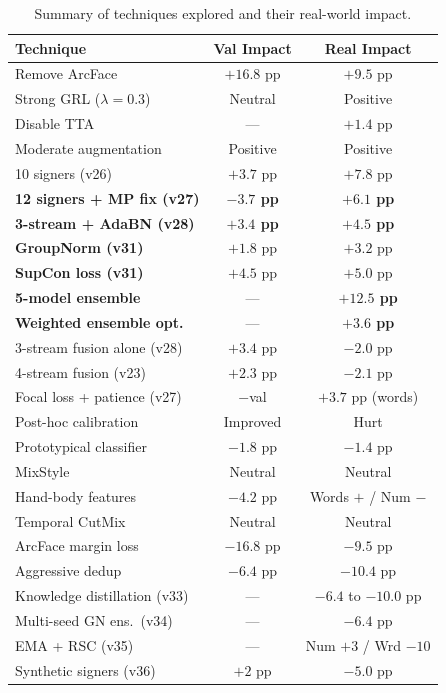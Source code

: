 \documentclass[conference]{IEEEtran}
\begin{document}
\begin{table}[t]
\centering
\caption{Summary of techniques explored and their real-world impact.}
\label{tab:whatworked}
\small
\begin{tabular}{@{}lcc@{}}
\toprule
\textbf{Technique} & \textbf{Val Impact} & \textbf{Real Impact} \\
\midrule
Remove ArcFace & $+16.8$ pp & $+9.5$ pp \\
Strong GRL ($\lambda=0.3$) & Neutral & Positive \\
Disable TTA & --- & $+1.4$ pp \\
Moderate augmentation & Positive & Positive \\
10 signers (v26) & $+3.7$ pp & $+7.8$ pp \\
\textbf{12 signers + MP fix (v27)} & \textbf{$-3.7$ pp} & \textbf{$+6.1$ pp} \\
\textbf{3-stream + AdaBN (v28)} & \textbf{$+3.4$ pp} & \textbf{$+4.5$ pp} \\
\textbf{GroupNorm (v31)} & $+1.8$ pp & $+3.2$ pp \\
\textbf{SupCon loss (v31)} & $+4.5$ pp & $+5.0$ pp \\
\textbf{5-model ensemble} & --- & \textbf{$+12.5$ pp} \\
\textbf{Weighted ensemble opt.} & --- & \textbf{$+3.6$ pp} \\
\midrule
3-stream fusion alone (v28) & $+3.4$ pp & $-2.0$ pp \\
4-stream fusion (v23) & $+2.3$ pp & $-2.1$ pp \\
Focal loss + patience (v27) & $-$val & $+3.7$ pp (words) \\
Post-hoc calibration & Improved & Hurt \\
Prototypical classifier & $-1.8$ pp & $-1.4$ pp \\
MixStyle & Neutral & Neutral \\
Hand-body features & $-4.2$ pp & Words $+$ / Num $-$ \\
Temporal CutMix & Neutral & Neutral \\
ArcFace margin loss & $-16.8$ pp & $-9.5$ pp \\
Aggressive dedup & $-6.4$ pp & $-10.4$ pp \\
Knowledge distillation (v33) & --- & $-6.4$ to $-10.0$ pp \\
Multi-seed GN ens.\ (v34) & --- & $-6.4$ pp \\
EMA + RSC (v35) & --- & Num $+3$ / Wrd $-10$ \\
Synthetic signers (v36) & $+2$ pp & $-5.0$ pp \\
\bottomrule
\end{tabular}
\end{table}
\end{document}

